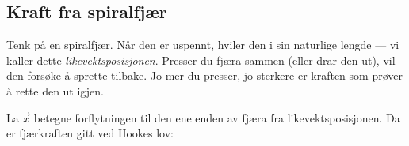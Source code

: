 \subsection{Kraft fra spiralfjær}
Tenk på en spiralfjær. Når den er uspennt, hviler den i sin naturlige lengde — vi kaller dette \textit{likevektsposisjonen}. Presser du fjæra sammen (eller drar den ut), vil den forsøke å sprette tilbake. Jo mer du presser, jo sterkere er kraften som prøver å rette den ut igjen.

La $\vec{x}$ betegne forflytningen til den ene enden av fjæra fra likevektsposisjonen. Da er fjærkraften gitt ved Hookes lov:


